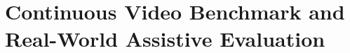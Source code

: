 \documentclass[final,5p,times,twocolumn,authoryear]{elsarticle}
\begin{document}
%
%
\providecommand{\EthicsBody}{\textbf{[APPROVING INSTITUTIONAL BODY]}}
\providecommand{\EthicsRef}{\textbf{[REFERENCE NUMBER]}}
\providecommand{\EthicsDate}{\textbf{[DD MONTH YYYY]}}
\providecommand{\ConsentStatement}{\textbf{[CONSENT STATEMENT --- written/oral, incl. video recording and data retention.]}}
\providecommand{\CompensationStatement}{\textbf{[COMPENSATION STATEMENT.]}}

\section{Continuous Video Benchmark and Real-World Assistive Evaluation}
\label{sec:video_evaluation}
\end{document}
